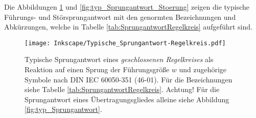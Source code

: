 Die Abbildungen \ref{fig:typ_Sprungantwort_Regelkreis} und \ref{fig:typ_Sprungantwort_Stoerung} zeigen die typische Führungs- und Störsprungantwort mit den genormten Bezeichnungen und Abkürzungen, welche in Tabelle \ref{tab:SprungantwortRegelkreis} aufgeführt sind.

\begin{figure}[hbtp]
    \begin{center}
        \texttt{[image: Inkscape/Typische\_Sprungantwort-Regelkreis.pdf]}
        \end{center}
        \caption{Typische Sprungantwort eines \emph{geschlossenen Regelkreises} als Reaktion auf einen Sprung der Führungsgröße $w$ und zugehörige Symbole nach DIN IEC 60050-351 (46-01). Für die Bezeichnungen siehe Tabelle \ref{tab:SprungantwortRegelkreis}. Achtung! Für die Sprungantwort eines Übertragungsgliedes alleine siehe Abbildung \ref{fig:typ_Sprungantwort}.}
        \label{fig:typ_Sprungantwort_Regelkreis}
\end{figure}

